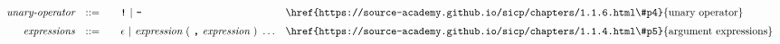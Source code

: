 \begin{alignat*}{9}
&& \textit{unary-operator}    
                        && ::= &\quad && \textbf{\texttt{!}}\ |\ \textbf{\texttt{-}}
                        && \textrm{\href{https://source-academy.github.io/sicp/chapters/1.1.6.html\#p4}{unary operator}}\\[1mm]
&& \textit{expressions}  && ::= &\quad && \epsilon\ | \ \textit{expression}\ (
                                                               \ \textbf{\texttt{,}} \
                                                                 \textit{expression} \ 
                                                                      )\ \ldots
                                                            && \textrm{\href{https://source-academy.github.io/sicp/chapters/1.1.4.html\#p5}{argument expressions}} 
\end{alignat*}
